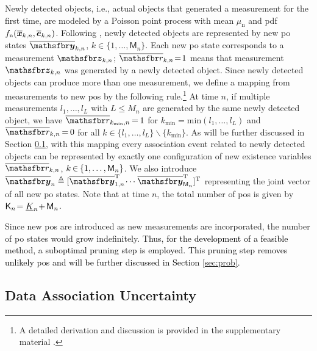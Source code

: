 \documentclass[10pt, twoside, romanappendices]{IEEEtran}
\providecommand{\rd}{\textcolor{black}}
\providecommand{\ist}{\hspace*{.3mm}}
\providecommand{\rmv}{\hspace*{-.3mm}}
\newcommand{\T}{\text{T}}
\begin{document}
Newly detected objects, i.e., actual objects that generated a measurement for the first time, are modeled by a Poisson point process with mean $\mu_{\mathrm{n}}$ and \ac{pdf} $f_{\mathrm{n}}(\overline{\bm{x}}_{k,n},\overline{\bm{e}}_{k,n})$. Following \cite{Wil:J15,MeyKroWilLauHlaBraWin:J18,GraFatSve:J19}, newly detected objects are represented by new \ac{po} states $\overline{\RV{y}}_{k,n}$, $k \in \{1,\dots,\mathsf{M}_n \}$. Each new \ac{po} state corresponds to a measurement $\RV{z}_{k,n}$; $\overline{\rv{r}}_{k,n} \!=\! 1$ means that measurement $\RV{z}_{k,n}$  was generated by a newly detected object. Since newly detected objects can produce more than one measurement, we define a mapping from measurements to new \acp{po} by the following rule.\footnote{A detailed derivation and discussion is provided in the supplementary material \cite{MeyWil:SM21}.} At time $n$, if multiple measurements $l_1, \dots, l_L$ with $L \leq M_n$ are generated by the same newly detected object, we have $\overline{\rv{r}}_{k_{\mathrm{min}},n} \rmv=\rmv 1$ for $k_{\mathrm{min}} = \mathrm{min}(l_1, \dots, l_L)$ and $\overline{\rv{r}}_{k,n} \rmv=\rmv 0$ for all $k \in \big\{l_1,\dots,l_L\big\} \backslash \big\{k_{\mathrm{min}}\big\}$. As will be further discussed in  Section \ref{sec:DataAssocUncer}, with this mapping every association event related to newly detected objects can be represented by exactly one configuration of new existence variables $\overline{\rv{r}}_{k,n}$, $k \rmv\in\rmv\{1,\dots,\mathsf{M}_n\}$. We also introduce $\overline{\RV{y}}_n \triangleq [ \overline{\RV{y}}^{\T}_{1,n} \rmv\cdots\ist \overline{\RV{y}}^{\T}_{\mathsf{M}_n} ]^{\T}$ representing the joint vector of all new \ac{po} states.  Note that at time $n$, the total number of \acp{po} is given by \vspace{0mm} $\mathsf{K}_n\!=\underline{K}_n \!+\rmv \mathsf{M}_n$. 

Since new \acp{po} are introduced as new measurements are incorporated, the number of \ac{po} states would grow indefinitely. \rd{Thus, for the development of a feasible method, a suboptimal pruning step is employed. This pruning step removes unlikely \acp{po} and will be further discussed in Section \ref{sec:prob}.}

\subsection{Data Association Uncertainty \vspace{-.5mm}}
\label{sec:DataAssocUncer}
\end{document}
